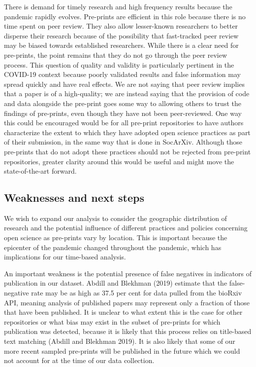 \documentclass[
]{article}
\begin{document}
There is demand for timely research and high frequency results because the pandemic rapidly evolves. Pre-prints are efficient in this role because there is no time spent on peer review. They also allow lesser-known researchers to better disperse their research because of the possibility that fast-tracked peer review may be biased towards established researchers. While there is a clear need for pre-prints, the point remains that they do not go through the peer review process. This question of quality and validity is particularly pertinent in the COVID-19 context because poorly validated results and false information may spread quickly and have real effects. We are not saying that peer review implies that a paper is of a high-quality; we are instead saying that the provision of code and data alongside the pre-print goes some way to allowing others to trust the findings of pre-prints, even though they have not been peer-reviewed. One way this could be encouraged would be for all pre-print repositories to have authors characterize the extent to which they have adopted open science practices as part of their submission, in the same way that is done in SocArXiv. Although those pre-prints that do not adopt these practices should not be rejected from pre-print repositories, greater clarity around this would be useful and might move the state-of-the-art forward.

\hypertarget{weaknesses-and-next-steps}{%
\subsection{Weaknesses and next steps}\label{weaknesses-and-next-steps}}

We wish to expand our analysis to consider the geographic distribution of research and the potential influence of different practices and policies concerning open science as pre-prints vary by location. This is important because the epicenter of the pandemic changed throughout the pandemic, which has implications for our time-based analysis.

An important weakness is the potential presence of false negatives in indicators of publication in our dataset. Abdill and Blekhman (2019) estimate that the false-negative rate may be as high as 37.5 per cent for data pulled from the bioRxiv API, meaning analysis of published papers may represent only a fraction of those that have been published. It is unclear to what extent this is the case for other repositories or what bias may exist in the subset of pre-prints for which publication was detected, because it is likely that this process relies on title-based text matching (Abdill and Blekhman 2019). It is also likely that some of our more recent sampled pre-prints will be published in the future which we could not account for at the time of our data collection.
\end{document}
